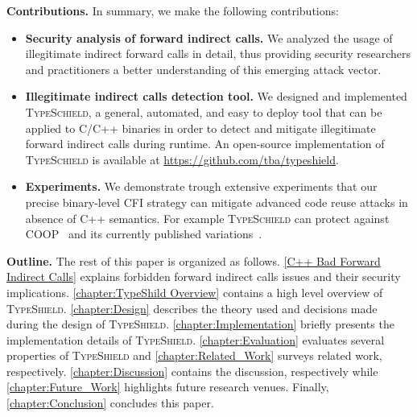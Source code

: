 \textbf{Contributions.} In summary, we make the following contributions:
\label{Contribution}
\begin{itemize}
 \item \textbf{Security analysis of forward indirect calls.} 
 We analyzed the usage of illegitimate indirect forward calls in detail,
 thus providing security researchers and
practitioners a better understanding of this emerging
attack vector.

 \item \textbf{Illegitimate indirect calls detection tool.}
 We designed and implemented \textsc{TypeSchield}, a general, automated, and easy to deploy tool
 that can be applied to C/C++ binaries in order to detect and mitigate illegitimate forward indirect calls 
 during runtime. An open-source implementation of \textsc{TypeSchield} is available at \url{https://github.com/tba/typeshield}.
 
 \item \textbf{Experiments.} We demonstrate trough extensive experiments that our precise
 binary-level CFI strategy can mitigate advanced code reuse attacks in absence of C++ semantics.
 For example \textsc{TypeSchield} can protect against COOP~\cite{schuster:coop} and its currently published 
 variations~\cite{ctf:coop, crane:readactor++, loop:oriented, subversive-c:lettner}.
  
\end{itemize}

\label{Outline}
\textbf{Outline.} The rest of this paper is organized as follows.
\cref{C++ Bad Forward Indirect Calls} explains forbidden forward indirect calls issues and their security implications.
\cref{chapter:TypeShild Overview} contains a high level overview of \textsc{TypeShield}.
\cref{chapter:Design} describes the theory used and decisions made during the design of \textsc{TypeShield}.
\cref{chapter:Implementation} briefly presents the implementation details of \textsc{TypeShield}.
\cref{chapter:Evaluation} evaluates several properties of \textsc{TypeShield} and
\cref{chapter:Related_Work} surveys related work, respectively.
\cref{chapter:Discussion} contains the discussion, respectively while 
\cref{chapter:Future_Work} highlights future research venues. 
Finally, \cref{chapter:Conclusion} concludes this paper.


